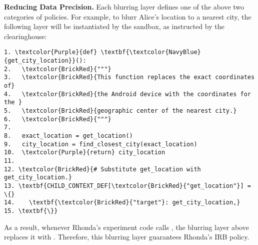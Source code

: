 %
\textbf{Reducing Data Precision.}
Each blurring layer defines one of the above two categories of policies. 
For example, to blurr Alice's location to a nearest city, the following layer
will be instantiated by the sandbox, as instructed by the clearinghouse:

\begin{Verbatim}
1. \textcolor{Purple}{def} \textbf{\textcolor{NavyBlue}{get_city_location}}():
2.   \textcolor{BrickRed}{"""}
3.   \textcolor{BrickRed}{This function replaces the exact coordinates of} 
4.   \textcolor{BrickRed}{the Android device with the coordinates for the } 
5.   \textcolor{BrickRed}{geographic center of the nearest city.}
6.   \textcolor{BrickRed}{"""}
7.
8.   exact_location = get_location()
9.   city_location = find_closest_city(exact_location)
10.  \textcolor{Purple}{return} city_location
11.
12. \textcolor{BrickRed}{# Substitute get_location with get_city_location.}
13. \textbf{CHILD_CONTEXT_DEF[\textcolor{BrickRed}{"get_location"}] = \{}
14.    \textbf{\textcolor{BrickRed}{"target"}: get_city_location,}
15. \textbf{\}}
\end{Verbatim}

As a result, whenever Rhonda's experiment code calls , 
the blurring layer above replaces it with . Therefore,
this blurring layer guarantees Rhonda's IRB policy.

